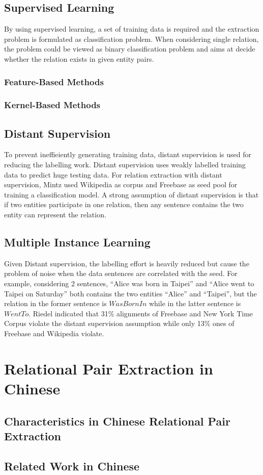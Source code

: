 \subsection{Supervised Learning}
By using supervised learning, a set of training data is required and the extraction problem is formulated as classification problem.
When considering single relation, the problem could be viewed as binary classification problem and aims at decide whether the relation exists in given entity pairs. 

\subsubsection{Feature-Based Methods}

\subsubsection{Kernel-Based Methods}

\subsection{Distant Supervision}
To prevent ineffieiently generating training data, distant supervision is used for reducing the labelling work. 
Distant supervision uses weakly labelled training data to predict huge testing data. 
For relation extraction with distant supervision, Mintz\cite{mintz_distant} used Wikipedia as corpus and Freebase as seed pool for training a classification model. 
A strong assumption of distant supervision is that if two entities participate in one relation, then any sentence contains the two entity can represent the relation. 

\subsection{Multiple Instance Learning}
Given Distant supervision, the labelling effort is heavily reduced but cause the problem of noise when the data sentences are correlated with the seed.
For example, considering 2 sentences, ``Alice was born in Taipei'' and ``Alice went to Taipei on Saturday'' both contains the two entities ``Alice'' and ``Taipei'', but the relation in the former sentence is $WasBornIn$ while in the latter sentence is $WentTo$.
Riedel\cite{riedel_modeling} indicated that 31\% alignments of Freebase and New York Time Corpus violate the distant supervision assumption while only 13\% ones of Freebase and Wikipedia violate.

\section{Relational Pair Extraction in Chinese}

\subsection{Characteristics in Chinese Relational Pair Extraction}
\subsection{Related Work in Chinese}

